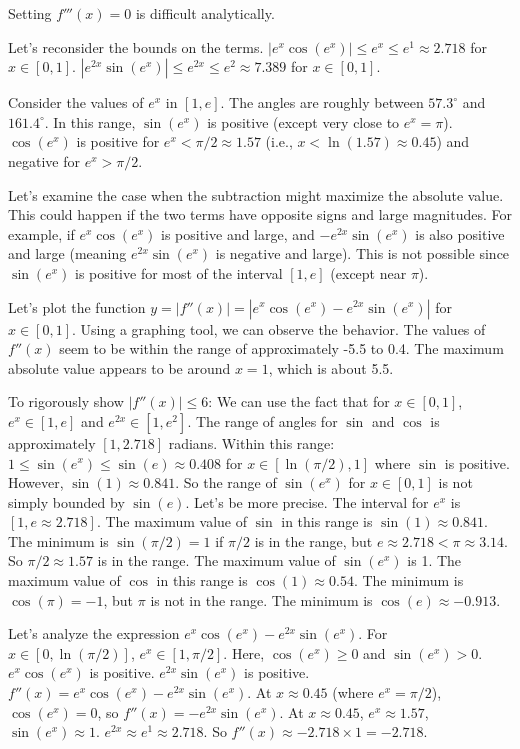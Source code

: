 \documentclass{article}
\begin{document}
Setting $f'''(x) = 0$ is difficult analytically.

Let's reconsider the bounds on the terms.
$|e^x \cos(e^x)| \leq e^x \leq e^1 \approx 2.718$ for $x \in [0, 1]$.
$|e^{2x} \sin(e^x)| \leq e^{2x} \leq e^2 \approx 7.389$ for $x \in [0, 1]$.

Consider the values of $e^x$ in $[1, e]$. The angles are roughly between $57.3^\circ$ and $161.4^\circ$.
In this range, $\sin(e^x)$ is positive (except very close to $e^x = \pi$).
$\cos(e^x)$ is positive for $e^x < \pi/2 \approx 1.57$ (i.e., $x < \ln(1.57) \approx 0.45$) and negative for $e^x > \pi/2$.

Let's examine the case when the subtraction might maximize the absolute value. This could happen if the two terms have opposite signs and large magnitudes.
For example, if $e^x \cos(e^x)$ is positive and large, and $-e^{2x} \sin(e^x)$ is also positive and large (meaning $e^{2x} \sin(e^x)$ is negative and large).
This is not possible since $\sin(e^x)$ is positive for most of the interval $[1, e]$ (except near $\pi$).

Let's plot the function $y = |f''(x)| = |e^x \cos(e^x) - e^{2x} \sin(e^x)|$ for $x \in [0, 1]$.
Using a graphing tool, we can observe the behavior.
The values of $f''(x)$ seem to be within the range of approximately -5.5 to 0.4.
The maximum absolute value appears to be around $x=1$, which is about 5.5.

To rigorously show $|f''(x)| \leq 6$:
We can use the fact that for $x \in [0, 1]$, $e^x \in [1, e]$ and $e^{2x} \in [1, e^2]$.
The range of angles for $\sin$ and $\cos$ is approximately $[1, 2.718]$ radians.
Within this range:
$1 \le \sin(e^x) \le \sin(e) \approx 0.408$ for $x \in [\ln(\pi/2), 1]$ where $\sin$ is positive.  However, $\sin(1) \approx 0.841$. So the range of $\sin(e^x)$ for $x \in [0,1]$ is not simply bounded by $\sin(e)$.
Let's be more precise. The interval for $e^x$ is $[1, e \approx 2.718]$.
The maximum value of $\sin$ in this range is $\sin(1) \approx 0.841$. The minimum is $\sin(\pi/2) = 1$ if $\pi/2$ is in the range, but $e \approx 2.718 < \pi \approx 3.14$. So $\pi/2 \approx 1.57$ is in the range. The maximum value of $\sin(e^x)$ is 1.
The maximum value of $\cos$ in this range is $\cos(1) \approx 0.54$. The minimum is $\cos(\pi) = -1$, but $\pi$ is not in the range. The minimum is $\cos(e) \approx -0.913$.

Let's analyze the expression $e^x \cos(e^x) - e^{2x} \sin(e^x)$.
For $x \in [0, \ln(\pi/2)]$, $e^x \in [1, \pi/2]$. Here, $\cos(e^x) \ge 0$ and $\sin(e^x) > 0$.
$e^x \cos(e^x)$ is positive. $e^{2x} \sin(e^x)$ is positive.
$f''(x) = e^x \cos(e^x) - e^{2x} \sin(e^x)$.
At $x \approx 0.45$ (where $e^x = \pi/2$), $\cos(e^x)=0$, so $f''(x) = -e^{2x} \sin(e^x)$.
At $x \approx 0.45$, $e^x \approx 1.57$, $\sin(e^x) \approx 1$. $e^{2x} \approx e^1 \approx 2.718$.
So $f''(x) \approx -2.718 \times 1 = -2.718$.
\end{document}
